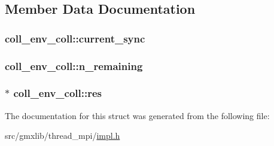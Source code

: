 \subsection{\-Member \-Data \-Documentation}
\hypertarget{structcoll__env__coll_aa9b2d9a0eda944f592443e26f2ede8de}{
\subsubsection[{current\-\_\-sync}]{ {\bf coll\-\_\-env\-\_\-coll\-::current\-\_\-sync}}}\label{structcoll__env__coll_aa9b2d9a0eda944f592443e26f2ede8de}
\hypertarget{structcoll__env__coll_ad61bbacc32b479bfe95d11e6884d7f07}{
\subsubsection[{n\-\_\-remaining}]{ {\bf coll\-\_\-env\-\_\-coll\-::n\-\_\-remaining}}}\label{structcoll__env__coll_ad61bbacc32b479bfe95d11e6884d7f07}
\hypertarget{structcoll__env__coll_a869a42318cfb2b77bed43a08339c8be2}{
\subsubsection[{res}]{$\ast$ {\bf coll\-\_\-env\-\_\-coll\-::res}}}\label{structcoll__env__coll_a869a42318cfb2b77bed43a08339c8be2}


\-The documentation for this struct was generated from the following file\-:\begin{DoxyCompactItemize}
\item 
src/gmxlib/thread\-\_\-mpi/\hyperlink{impl_8h}{impl.\-h}\end{DoxyCompactItemize}
